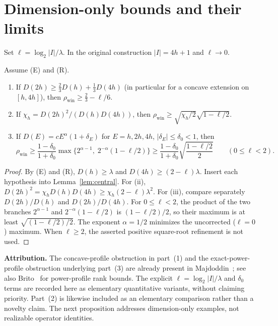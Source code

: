 \documentclass[10pt,a4paper]{article}
\numberwithin{equation}{section}
\theoremstyle{remark}\newtheorem{remark}[theorem]{Remark}\newtheorem{question}[theorem]{Question}
\newcommand{\rhow}{\rho_{\mathrm{win}}}\newcommand{\F}{\mathbb F}\newcommand{\K}{\mathbb K}\newcommand{\Z}{\mathbb Z}\newcommand{\R}{\mathbb R}\newcommand{\cB}{\mathcal L}\newcommand{\wt}{\mathrm{wt}}\newcommand{\dimn}{\operatorname{dim}}\newcommand{\supp}{\operatorname{supp}}
\begin{document}
\section{Dimension-only bounds and their limits}\label{sec:dimensions}
Set $\ell=\log_2|I|/\lambda$. In the original construction $|I|=4h+1$ and $\ell\to0$.
\begin{proposition}\label{prop:profiles}
Assume (E) and (R).
\begin{enumerate}
\item If $D(2h)\ge\tfrac23D(h)+\tfrac13D(4h)$ (in particular for a concave extension on $[h,4h]$), then $\rhow\ge\tfrac23-\ell/6$.
\item If $\chi_h=D(2h)^2/(D(h)D(4h))$, then $\rhow\ge\sqrt{\chi_h/2}\sqrt{1-\ell/2}$.
\item If $D(E)=cE^\alpha(1+\delta_E)$ for $E=h,2h,4h$, $|\delta_E|\le\delta_0<1$, then
\[
\rhow\ge\frac{1-\delta_0}{1+\delta_0}\max\{2^{\alpha-1},\;2^{-\alpha}(1-\ell/2)\}
\ge\frac{1-\delta_0}{1+\delta_0}\sqrt{\frac{1-\ell/2}{2}}\qquad(0\le\ell<2).
\]
\end{enumerate}
\end{proposition}
\begin{proof}By (E) and (R), $D(h)\ge\lambda$ and $D(4h)\ge(2-\ell)\lambda$. Insert each hypothesis into Lemma~\ref{lem:central}. For (ii), $D(2h)^2=\chi_hD(h)D(4h)\ge\chi_h(2-\ell)\lambda^2$. For (iii), compare separately $D(2h)/D(h)$ and $D(2h)/D(4h)$. For $0\le\ell<2$, the product of the two branches $2^{\alpha-1}$ and $2^{-\alpha}(1-\ell/2)$ is $(1-\ell/2)/2$, so their maximum is at least $\sqrt{(1-\ell/2)/2}$. The exponent $\alpha=1/2$ minimizes the uncorrected ($\ell=0$) maximum. When $\ell\ge2$, the asserted positive square-root refinement is not used.\end{proof}
\textbf{Attribution.} The concave-profile obstruction in part~(1) and the exact-power-profile obstruction underlying part~(3) are already present in Majdoddin~\cite[Section~4.7, Proposition~4.24 and subsequent discussion]{majdoddin}; see also Brito~\cite{brito} for power-profile rank bounds. The explicit $\ell=\log_2|I|/\lambda$ and $\delta_0$ terms are recorded here as elementary quantitative variants, without claiming priority. Part~(2) is likewise included as an elementary comparison rather than a novelty claim. The next proposition addresses dimension-only examples, not realizable operator identities.
\end{document}
